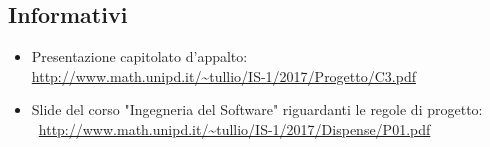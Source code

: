 \subsection*{Informativi}
\begin{itemize}
	\item Presentazione capitolato d'appalto: \\ \url{http://www.math.unipd.it/~tullio/IS-1/2017/Progetto/C3.pdf}
	\item Slide del corso "Ingegneria del Software" riguardanti le regole di progetto: \\\ \url{http://www.math.unipd.it/~tullio/IS-1/2017/Dispense/P01.pdf}
\end{itemize}